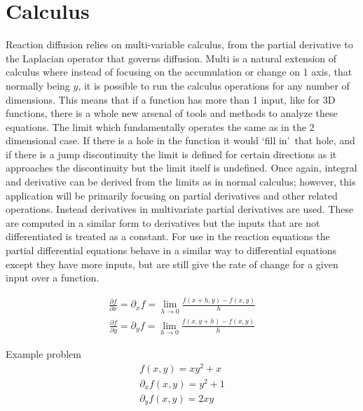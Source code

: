 \documentclass[12pt, letterpaper]{article}
\newcommand{\sorta}[1]{\lq #1\rq \,}
\begin{document}
\section{Calculus} \label{calculus}
Reaction diffusion relies on multi-variable calculus, from the partial derivative to the Laplacian 
operator that governs diffusion. Multi is a natural extension of calculus where instead of 
focusing on the accumulation or change on 1 axis, that normally being $y$, it is possible to run the calculus
operations for any
number of dimensions. This means that if a function has more than 1 input, like for 3D functions,
there is a whole new arsenal of tools and methods to analyze these equations. The limit
which fundamentally operates the same as in the 2 dimensional case. If there is a hole in the function it
would \sorta{fill in} that hole, and if there is a jump discontinuity the limit is
defined for certain directions as it approaches the discontinuity but the limit itself is undefined. Once
again, integral and derivative can be derived from the limits as in normal calculus; however, this
application will be primarily focusing on partial derivatives and other related operations. Instead
derivatives in multivariate partial derivatives are used. These are computed in a similar form to
derivatives but the inputs that are not
differentiated is treated as a constant. For use in the reaction equations the partial differential equations
behave in a similar way to differential equations except they have more inputs, but are still give the rate 
of change for a given input over a function.

\begin{singlespace}
  \begin{gather}
    \frac{\partial f}{\partial x} = \partial_x{f} = \lim_{h \to 0} \frac{f(x+h, y) − f(x,y)}{h}
    \label{eq:partX}
  \end{gather}
  \begin{gather}
    \frac{\partial f}{\partial y} = \partial_y{f} = \lim_{h \to 0} \frac{f(x, y + h) − f(x,y)}{h}
    \label{eq:partY}
  \end{gather}

  \begin{center}
   Example problem
   \begin{gather*}
    f(x, y) = xy^2 + x \\
    \partial_x f(x,y) = y^2 + 1 \\
    \partial_y f(x,y) = 2xy
   \end{gather*}
  \end{center}
\end{singlespace}
\end{document}
